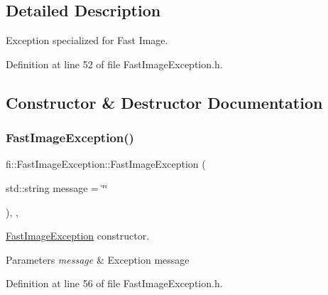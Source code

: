 \subsection{Detailed Description}
Exception specialized for Fast Image. 

Definition at line 52 of file Fast\+Image\+Exception.\+h.



\subsection{Constructor \& Destructor Documentation}
\mbox{\label{classfi_1_1FastImageException_a0c33cb505f265f4f5a8501500b90795a}} 
\subsubsection{\texorpdfstring{Fast\+Image\+Exception()}{FastImageException()}\hspace{0.1cm}{\footnotesize\ttfamily [1/2]}}
{\footnotesize\ttfamily fi\+::\+Fast\+Image\+Exception\+::\+Fast\+Image\+Exception (\begin{DoxyParamCaption}\item[{std\+::string}]{message = {\ttfamily \char`\"{}\char`\"{}} }\end{DoxyParamCaption})\hspace{0.3cm}{\ttfamily [inline]}, {\ttfamily [explicit]}, {\ttfamily [noexcept]}}



\hyperlink{classfi_1_1FastImageException}{Fast\+Image\+Exception} constructor. 


\begin{DoxyParams}{Parameters}
{\em message} & Exception message \\
\hline
\end{DoxyParams}


Definition at line 56 of file Fast\+Image\+Exception.\+h.

\mbox{\label{classfi_1_1FastImageException_a96ff2db20c0f2ba43ed962afa999c5fb}} 
